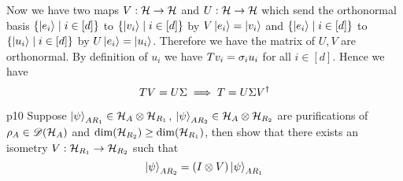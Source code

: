 \documentclass[a4paper, 11pt]{article}
\begin{document}
{Now we have two maps $V:\mathcal{H}\to \mathcal{H}$ and $U:\mathcal{H}\to \mathcal{H}$ which send the orthonormal basis $\{\ket{e_i}\mid i\in [d]\}$ to $\{\ket{v_i}\mid i\in [d]\}$ by $V\ket{e_i}=\ket{v_i}$ and $\{\ket{e_i}\mid i\in [d]\}$ to $\{\ket{u_i}\mid i\in [d]\}$ by $U\ket{e_i}=\ket{u_i}$. Therefore we have the matrix of $U,V$ are orthonormal. By definition of $u_i$ we have  $Tv_i=\sigma_iu_i$ for all $i\in[d]$. Hence we have $$TV=U\Sigma\implies T=U\Sigma V^{\dagger}$$ 
}

\pagebreak

\begin{problem}{%
	}{p10%
	}
	Suppose $\ket{\psi}_{AR_1}\in \mathcal{H}_{A}\otimes \mathcal{H}_{R_1}$, $\ket{\psi}_{AR_2}\in \mathcal{H}_A\otimes \mathcal{H}_{R_2}$ are purifications of  $\rho_A\in {\mathscr{D}}(\mathcal{H}_A)$ and $\dim(\mathcal{H}_{R_2})\geq \dim(\mathcal{H}_{R_1})$, then show that  there exists an isometry $V:\mathcal{H}_{R_1}\to \mathcal{H}_{R_2}$  such that $$\ket{\psi}_{AR_2}=(I\otimes V)\ket{\psi}_{AR_1}$$
\end{problem}
\end{document}
